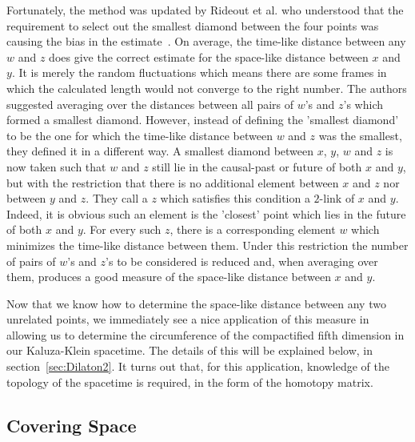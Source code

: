 \documentclass[a4paper,12pt]{article}
\numberwithin{equation}{section}
\begin{document}
Fortunately, the method was updated by Rideout et al. who understood that the requirement to select out the smallest diamond between the four points was causing the bias in the estimate~\cite{Rideout2009}. On average, the time-like distance between any $w$ and $z$ does give the correct estimate for the space-like distance between $x$ and $y$. It is merely the random fluctuations which means there are some frames in which the calculated length would not converge to the right number. The authors suggested averaging over the distances between all pairs of $w$'s and $z$'s which formed a smallest diamond. However, instead of defining the 'smallest diamond' to be the one for which the time-like distance between $w$ and $z$ was the smallest, they defined it in a different way. A smallest diamond between $x$, $y$, $w$ and $z$ is now taken such that $w$ and $z$ still lie in the causal-past or future of both $x$ and $y$, but with the restriction that there is no additional element between $x$ and $z$ nor between $y$ and $z$. They call a $z$ which satisfies this condition a $2$-link of $x$ and $y$. Indeed, it is obvious such an element is the 'closest' point which lies in the future of both $x$ and $y$. For every such $z$, there is a corresponding element $w$ which minimizes the time-like distance between them. Under this restriction the number of pairs of $w$'s and $z$'s to be considered is reduced and, when averaging over them, produces a good measure of the space-like distance between $x$ and $y$.

Now that we know how to determine the space-like distance between any two unrelated points, we immediately see a nice application of this measure in allowing us to determine the circumference of the compactified fifth dimension in our Kaluza-Klein spacetime. The details of this will be explained below, in section~\ref{sec:Dilaton2}. It turns out that, for this application, knowledge of the topology of the spacetime is required, in the form of the homotopy matrix.


\subsection{Covering Space}
\label{sec:Covering Space}
\end{document}
